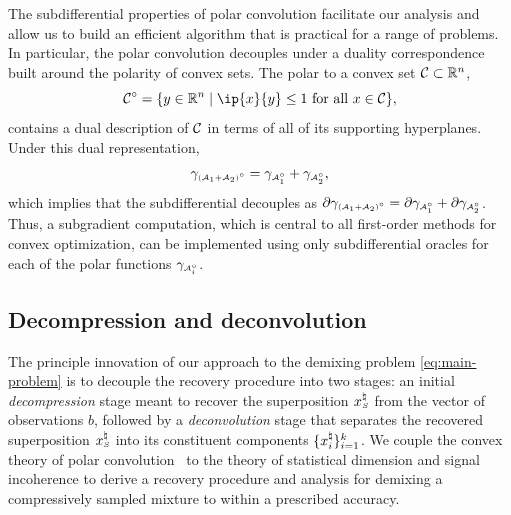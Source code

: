 The subdifferential properties of polar convolution facilitate our analysis and allow us to build an efficient algorithm that is practical for a range of problems. In particular, the polar convolution decouples under a duality correspondence built around the polarity of convex sets. The polar to a convex set $\mathcal{C}\subset\mathbb{R}^n$,
\[
  \Cscr\polar = \{y \in\Re^n \mid \ip{x}{y}\leq 1 \mbox{ for all } x \in \Cscr\},
\]
contains a dual description of $\mathcal{C}$ in terms of all of its supporting hyperplanes. Under this dual representation,
\[
  \gamma_{\scriptscriptstyle(\mathcal{A}_1+\mathcal{A}_2)^\circ}
  = \gamma_{\scriptscriptstyle\mathcal{A}_1^\circ} + \gamma_{\scriptscriptstyle\mathcal{A}_2^\circ},
\]
which implies that the subdifferential decouples as 
$\partial \gamma_{\scriptscriptstyle(\mathcal{A}_1+\mathcal{A}_2)^\circ} = \partial\gamma_{\scriptscriptstyle\mathcal{A}_1^\circ}+\partial\gamma_{\scriptscriptstyle\mathcal{A}_2^\circ}$. Thus, a subgradient computation, which is central to all first-order methods for convex optimization, can be implemented using only subdifferential oracles for each of the polar functions $\gamma_{\scriptscriptstyle\mathcal{A}_i^\circ}$. 

\subsection{Decompression and deconvolution}\label{sec:decompression-deconvolution}

The principle innovation of our approach to the demixing problem \eqref{eq:main-problem} is to decouple the recovery procedure into two stages: an initial \emph{decompression} stage meant to recover the superposition $x_{\scriptscriptstyle S}^\natural$ from the vector of observations $b$, followed by a \emph{deconvolution} stage that separates the recovered superposition $x_{\scriptscriptstyle S}^\natural$ into its constituent components $\{x_i^{\natural}\}_{i=1}^k$. We couple the convex theory of polar convolution~\cite{friedlander2019polarconvolution} to the theory of statistical dimension and signal incoherence to derive a recovery procedure and analysis for demixing a compressively sampled mixture to within a prescribed accuracy.

